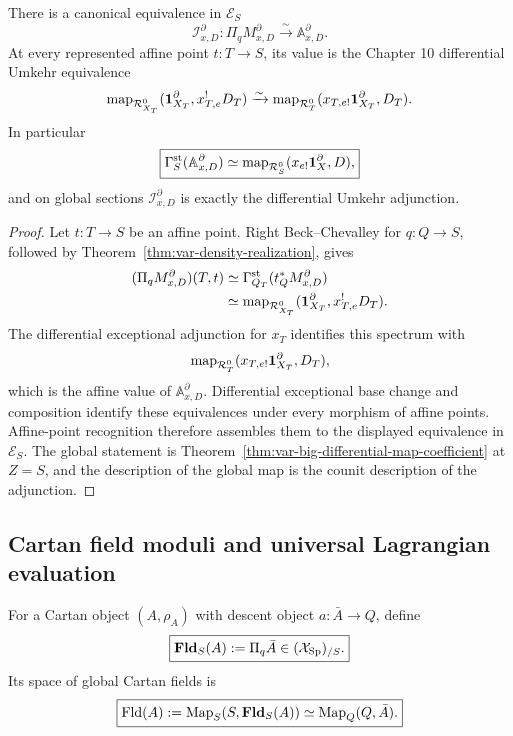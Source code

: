 \begin{theorem}
\label{thm:var-big-exceptional-integration}
There is a canonical equivalence in \(\mathcal E_S\)
\[
    \boxed{
    \mathcal I^\partial_{x,D}:
    \Pi_qM^\partial_{x,D}
    \xrightarrow{\sim}
    \mathbb A^\partial_{x,D}.
    }
\]
At every represented affine point \(t:T\to S\), its value is the Chapter 10 differential Umkehr equivalence
\[
    \operatorname{map}_{\mathcal R_{X_T}^0}
    (\mathbf 1_{X_T}^\partial,x_{T,e}^!D_T)
    \xrightarrow{\sim}
    \operatorname{map}_{\mathcal R_T^0}
    (x_{T,e!}\mathbf 1_{X_T}^\partial,D_T).
\]
In particular
\[
    \boxed{
    \Gamma_S^{\mathrm{st}}(\mathbb A^\partial_{x,D})
    \simeq
    \operatorname{map}_{\mathcal R_S^0}
    (x_{e!}\mathbf 1_X^\partial,D),
    }
\]
and on global sections \(\mathcal I^\partial_{x,D}\) is exactly the differential Umkehr adjunction.
\end{theorem}

\begin{proof}
Let \(t:T\to S\) be an affine point. Right Beck--Chevalley for \(q:Q\to S\), followed by Theorem~\ref{thm:var-density-realization}, gives
\[
\begin{aligned}
    (\Pi_qM^\partial_{x,D})(T,t)
    &\simeq
    \Gamma_{Q_T}^{\mathrm{st}}
    (t_Q^*M^\partial_{x,D})
    \\
    &\simeq
    \operatorname{map}_{\mathcal R_{X_T}^0}
    (\mathbf 1_{X_T}^\partial,x_{T,e}^!D_T).
\end{aligned}
\]
The differential exceptional adjunction for \(x_T\) identifies this spectrum with
\[
    \operatorname{map}_{\mathcal R_T^0}
    (x_{T,e!}\mathbf 1_{X_T}^\partial,D_T),
\]
which is the affine value of \(\mathbb A^\partial_{x,D}\). Differential exceptional base change and composition identify these equivalences under every morphism of affine points. Affine-point recognition therefore assembles them to the displayed equivalence in \(\mathcal E_S\). The global statement is Theorem~\ref{thm:var-big-differential-map-coefficient} at \(Z=S\), and the description of the global map is the counit description of the adjunction.
\end{proof}

\subsection{Cartan field moduli and universal Lagrangian evaluation}

\begin{definition}
\label{def:var-field-moduli}
For a Cartan object \((A,\rho_A)\) with descent object \(a:\bar A\to Q\), define
\[
    \boxed{
    \mathbf{Fld}_S(A)
    :=
    \Pi_q\bar A
    \in
    (\mathcal{X}_{\mathrm{Sp}})_{/S}.
    }
\]
Its space of global Cartan fields is
\[
    \boxed{
    \operatorname{Fld}(A)
    :=
    \operatorname{Map}_S(S,\mathbf{Fld}_S(A))
    \simeq
    \operatorname{Map}_Q(Q,\bar A).
    }
\]
\end{definition}

